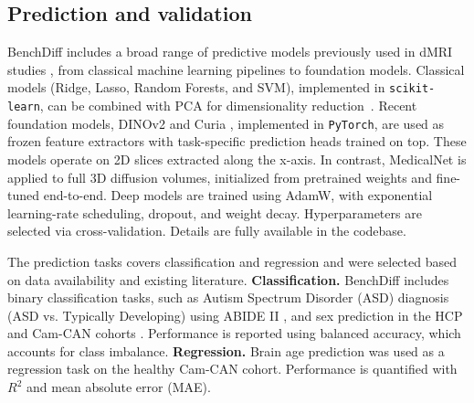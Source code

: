 \subsection{Prediction and validation}
BenchDiff includes a broad range of predictive models previously used in dMRI studies \cite{wen2021reproducible,cardenas2025autism}, from classical machine learning pipelines to foundation models. 
Classical models (Ridge, Lasso, Random Forests, and SVM), implemented in \texttt{scikit-learn}, can be combined with PCA for dimensionality reduction~\cite{menon2020microstructural}.
Recent foundation models, DINOv2 \cite{oquab2023dinov2} and Curia \cite{dancette2025curia}, implemented in \texttt{PyTorch}, are used as frozen feature extractors with task-specific prediction heads trained on top.
These models operate on 2D slices extracted along the x-axis.
In contrast, MedicalNet \cite{chen2019med3d} is applied to full 3D diffusion volumes, initialized from pretrained weights and fine-tuned end-to-end.
Deep models are trained using AdamW, with exponential learning-rate scheduling, dropout, and weight decay.
Hyperparameters are selected via cross-validation.
Details are fully available in the codebase.



The prediction tasks covers classification and regression and were selected based on data availability and existing literature. 
\textbf{Classification.} 
BenchDiff includes binary classification tasks, such as Autism Spectrum Disorder (ASD) diagnosis (ASD vs. 
Typically Developing) using ABIDE II \cite{cardenas2025autism}, and sex prediction in the HCP and Cam-CAN 
cohorts \cite{chen2024deep,dibaji2024sex}. Performance is reported using balanced accuracy, which accounts for class imbalance. 
\textbf{Regression.} Brain age prediction \cite{chen2020generalization,de2018age,hwang2021prediction} was used as a regression task on the healthy Cam-CAN cohort.
Performance is quantified with $R^2$ and mean absolute error (MAE). 

